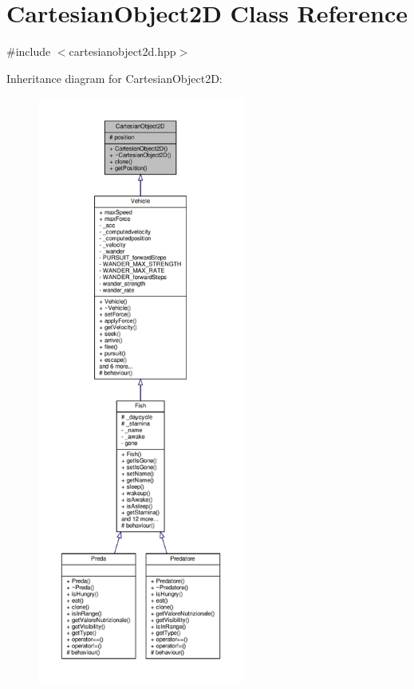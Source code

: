 \hypertarget{classCartesianObject2D}{}\section{Cartesian\+Object2D Class Reference}
\label{classCartesianObject2D}


{\ttfamily \#include $<$cartesianobject2d.\+hpp$>$}



Inheritance diagram for Cartesian\+Object2D\+:\nopagebreak
\begin{figure}[H]
\begin{center}
\leavevmode
\includegraphics[height=550pt]{classCartesianObject2D__inherit__graph}
\end{center}
\end{figure}


